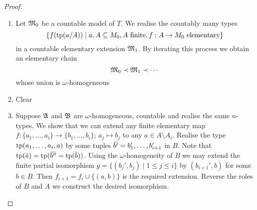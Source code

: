 \documentclass[11pt]{article}
\begin{document}
\begin{proof}
\begin{enumerate}
\item Let \(\mathfrak{M}_0\) be a countable model of \(T\). We realise the countably many types
\begin{equation*}
\{f(\operatorname{tp}(a/A))\mid a,A\subseteq M_0,A\text{ finite},f:A\to M_0\text{ elementary}\}
\end{equation*}
in a countable elementary extension \(\mathfrak{M}_1\). By iterating this process we obtain an elementary
chain
\begin{equation*}
\mathfrak{M}_0\prec\mathfrak{M}_1\prec\cdots
\end{equation*}
whose union is \(\omega\)-homogeneous
\item Clear
\item Suppose \(\mathfrak{A}\) and \(\mathfrak{B}\) are \(\omega\)-homogeneous, countable and realise the same \(n\)-types. We
show that we can extend any finite elementary map \(f:\{a_1,\dots,a_i\}\to\{b_1,\dots,b_i\}\); \(a_j\mapsto b_j\) to
any \(a\in A\setminus A_i\). Realise the type \(\operatorname{tp}(a_1,\dots,a_i,a)\) by some
tuples \(\bbar{b'}=b_1',\dots,b_{i+1}'\) in \(B\). Note
that \(\tp(\bara)=\tp(\bbar{b''}=\tp(\barb))\). Using the \(\omega\)-homogeneity of \(B\) we may extend
the finite partial isomorphism \(g=\{(b_j',b_j)\mid 1\le j\le i\}\) by \((b_{i+1}',b)\) for
some \(b\in B\). Then \(f_{i+1}=f_i\cup\{(a,b)\}\) is the required extension. Reverse the roles
of \(B\) and \(A\) we construct the desired isomorphism.
\end{enumerate}
\end{proof}
\end{document}
